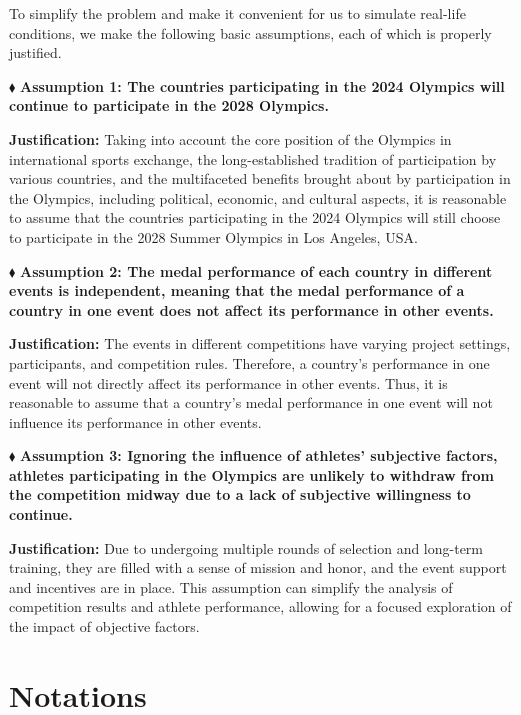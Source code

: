 \documentclass{mcmthesis}
\begin{document}
To simplify the problem and make it convenient for us to simulate real-life conditions, we make the following basic assumptions, each of which is properly justified.

$  \blacklozenge $  {\bf Assumption 1: The countries participating in the 2024 Olympics will continue to participate in the 2028 Olympics.}

{\bf Justification:} Taking into account the core position of the Olympics in international sports exchange, the long-established tradition of participation by various countries, and the multifaceted benefits brought about by participation in the Olympics, including political, economic, and cultural aspects, it is reasonable to assume that the countries participating in the 2024 Olympics will still choose to participate in the 2028 Summer Olympics in Los Angeles, USA.

$  \blacklozenge $  {\bf Assumption 2: The medal performance of each country in different events is independent, meaning that the medal performance of a country in one event does not affect its performance in other events.}

{\bf Justification:} The events in different competitions have varying project settings, participants, and competition rules. Therefore, a country's performance in one event will not directly affect its performance in other events. Thus, it is reasonable to assume that a country's medal performance in one event will not influence its performance in other events.

$  \blacklozenge $  {\bf Assumption 3: Ignoring the influence of athletes' subjective factors, athletes participating in the Olympics are unlikely to withdraw from the competition midway due to a lack of subjective willingness to continue.}

{\bf Justification:} Due to undergoing multiple rounds of selection and long-term training, they are filled with a sense of mission and honor, and the event support and incentives are in place. This assumption can simplify the analysis of competition results and athlete performance, allowing for a focused exploration of the impact of objective factors.

\section{Notations}
\end{document}
